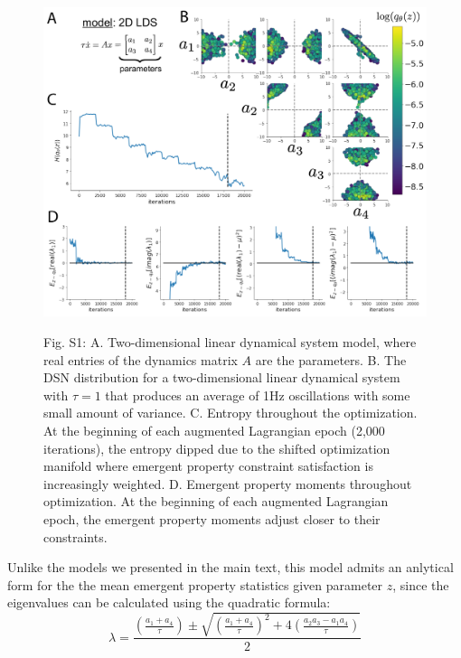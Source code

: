 \documentclass[11pt]{article}
\begin{document}
\begin{figure}
\begin{center}
\includegraphics[scale=0.5]{figures/figS2/figS2.pdf}
\end{center}
\begin{flushleft}
Fig. S1: A. Two-dimensional linear dynamical system model, where real entries of the dynamics matrix $A$ are the parameters.  B. The DSN distribution for a two-dimensional linear dynamical system  with $\tau=1$ that produces an average of 1Hz oscillations with some small amount of variance.  C. Entropy throughout the optimization.  At the beginning of each augmented Lagrangian epoch (2,000 iterations), the entropy dipped due to the shifted optimization manifold where emergent property constraint satisfaction is increasingly weighted.  D. Emergent property moments throughout optimization.  At the beginning of each augmented Lagrangian epoch, the emergent property moments adjust closer to their constraints.
\end{flushleft}
\end{figure}

Unlike the models we presented in the main text, this model admits an anlytical form for the the mean emergent property statistics given parameter $z$, since the eigenvalues can be calculated using the quadratic formula: 
\begin{equation}
\lambda = \frac{(\frac{a_1 + a_4}{\tau}) \pm \sqrt{(\frac{a_1+a_4}{\tau})^2 + 4(\frac{a_2 a_3 - a_1 a_4}{\tau})}}{2}
\end{equation}
\end{document}

